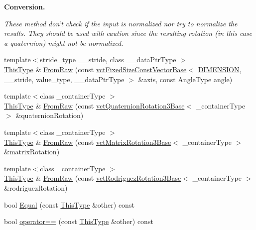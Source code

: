 \begin{Indent}{\bf Conversion.}\par
{\em These method don't check if the input is normalized nor try to normalize the results. They should be used with caution since the resulting rotation (in this case a quaternion) might not be normalized. }\begin{DoxyCompactItemize}
\item 
{\footnotesize template$<$stride\-\_\-type \-\_\-\-\_\-stride, class \-\_\-\-\_\-data\-Ptr\-Type $>$ }\\\hyperlink{classvct_axis_angle_rotation3_af654a8037b7b82a378f69cb1bfd9b8dd}{This\-Type} \& \hyperlink{classvct_axis_angle_rotation3_a220791aee1a43056534d744fe932aa0c}{From\-Raw} (const \hyperlink{classvct_fixed_size_const_vector_base}{vct\-Fixed\-Size\-Const\-Vector\-Base}$<$ \hyperlink{classvct_axis_angle_rotation3_a278b4a98a62e4f5ff42ce055836240a9a778d22dfe29402d2cfdd381c1b870285}{D\-I\-M\-E\-N\-S\-I\-O\-N}, \-\_\-\-\_\-stride, value\-\_\-type, \-\_\-\-\_\-data\-Ptr\-Type $>$ \&axis, const Angle\-Type angle)
\item 
{\footnotesize template$<$class \-\_\-container\-Type $>$ }\\\hyperlink{classvct_axis_angle_rotation3_af654a8037b7b82a378f69cb1bfd9b8dd}{This\-Type} \& \hyperlink{classvct_axis_angle_rotation3_a86dd746e2ebc26d0773aaac3359fe98a}{From\-Raw} (const \hyperlink{classvct_quaternion_rotation3_base}{vct\-Quaternion\-Rotation3\-Base}$<$ \-\_\-container\-Type $>$ \&quaternion\-Rotation)
\item 
{\footnotesize template$<$class \-\_\-container\-Type $>$ }\\\hyperlink{classvct_axis_angle_rotation3_af654a8037b7b82a378f69cb1bfd9b8dd}{This\-Type} \& \hyperlink{classvct_axis_angle_rotation3_af2312e336196ae9e18d8380ec03035e4}{From\-Raw} (const \hyperlink{classvct_matrix_rotation3_base}{vct\-Matrix\-Rotation3\-Base}$<$ \-\_\-container\-Type $>$ \&matrix\-Rotation)
\item 
{\footnotesize template$<$class \-\_\-container\-Type $>$ }\\\hyperlink{classvct_axis_angle_rotation3_af654a8037b7b82a378f69cb1bfd9b8dd}{This\-Type} \& \hyperlink{classvct_axis_angle_rotation3_a9743ce2a4bf2b409ebaca2ab81d45d60}{From\-Raw} (const \hyperlink{classvct_rodriguez_rotation3_base}{vct\-Rodriguez\-Rotation3\-Base}$<$ \-\_\-container\-Type $>$ \&rodriguez\-Rotation)
\end{DoxyCompactItemize}
\end{Indent}
{\bf }\par
\begin{DoxyCompactItemize}
\item 
bool \hyperlink{classvct_axis_angle_rotation3_aec0f3161d774f905800a1952f20bcb54}{Equal} (const \hyperlink{classvct_axis_angle_rotation3_af654a8037b7b82a378f69cb1bfd9b8dd}{This\-Type} \&other) const 
\item 
bool \hyperlink{classvct_axis_angle_rotation3_a984a5e120d4c3bdc4ded5560a4b9f7b6}{operator==} (const \hyperlink{classvct_axis_angle_rotation3_af654a8037b7b82a378f69cb1bfd9b8dd}{This\-Type} \&other) const 
\end{DoxyCompactItemize}

